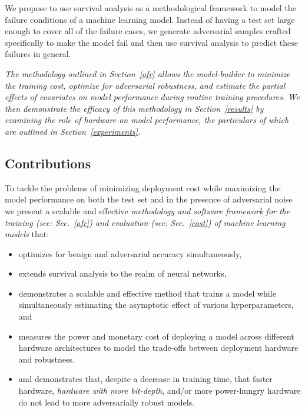 \documentclass[conference]{IEEEtran}
\newcommand{\cm}[1]{\textit{{\color{blue}#1}}}
\begin{document}
We propose to use survival analysis as a methodological framework to model the failure conditions of a machine learning model. Instead of having a test set large enough to cover all of the failure cases, we generate adversarial samples crafted specifically to make the model fail and then use survival analysis to predict these failures in general.


\cm{The methodology outlined in Section~\ref{afr} allows the model-builder to minimize the training cost, optimize for adversarial robustness, and estimate the partial effects of covariates on model performance during routine training procedures. We then demonstrate the efficacy of this methodology in Section~\ref{results} by examining the role of hardware on model performance, the particulars of which are outlined in Section~\ref{experiments}.}


\subsection{Contributions}
To tackle the problems of minimizing deployment cost while maximizing the model performance on both the test set and in the presence of adversarial noise we present a scalable and effective \cm{methodology and software framework for the training (see: Sec.~\ref{afr}) and evaluation (see: Sec.~\ref{cost}) of machine learning models} that:
\begin{itemize}
    \item optimizes for benign and adversarial accuracy simultaneously,
    \item extends survival analysis to the realm of neural networks, 
    \item demonstrates a scalable and effective method that trains a model while simultaneously estimating the asymptotic effect of various hyperparameters, and
    \item measures the power and monetary cost of deploying a model across different hardware architectures to model the trade-offs between deployment hardware and robustness.
    \item and demonstrates that, despite a decrease in training time, that faster hardware, \cm{hardware with more bit-depth}, and/or more power-hungry hardware do not lead to more adversarially robust models.
    
\end{itemize}
\end{document}
